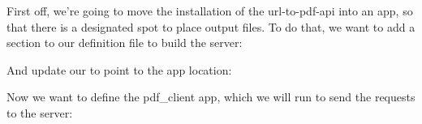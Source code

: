\documentclass[letterpaper,10pt,english]{sphinxmanual}
\begin{document}
First off, we’re going to move the installation of the url-to-pdf-api
into an app, so that there is a designated spot to place output files.
To do that, we want to add a section to our definition file to build
the server:

%
\begin{sphinxVerbatim}[commandchars=\\\{\}]
 

       

     

     

       
\end{sphinxVerbatim}

And update our  to point to the app location:

%
\begin{sphinxVerbatim}[commandchars=\\\{\}]

     


            
\end{sphinxVerbatim}

Now we want to define the pdf\_client app, which we will run to send the
requests to the server:
\end{document}

